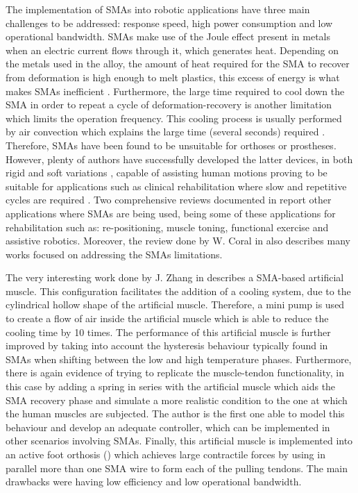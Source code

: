 The implementation of SMAs into robotic applications have three main challenges to be addressed: response speed, high power consumption and low operational bandwidth. SMAs make use of the Joule effect present in metals when an electric current flows through it, which generates heat. Depending on the metals used in the alloy, the amount of heat required for the SMA to recover from deformation is high enough to melt plastics, this excess of energy is what makes SMAs inefficient \cite{Bundhoo2009a}. Furthermore, the large time required to cool down the SMA in order to repeat a cycle of deformation-recovery is another limitation which limits the operation frequency. This cooling process is usually performed by air convection which explains the large time (several seconds) required \cite{Bundhoo2009}. Therefore, SMAs have been found to be unsuitable for orthoses or prostheses. However, plenty of authors have successfully developed the latter devices, in both rigid \cite{tarkesh2007} and soft variations \cite{Stirling2011}, capable of assisting human motions proving to be suitable for applications such as clinical rehabilitation where slow and repetitive cycles are required \cite{Pittaccio2009,Chenal2014}. Two comprehensive reviews documented in \cite{pittaccio2012shape,Coral2012} report other applications where SMAs are being used, being some of these applications for rehabilitation such as: re-positioning, muscle toning, functional exercise and assistive robotics. Moreover, the review done by W. Coral in \cite{Coral2012} also describes many works focused on addressing the SMAs limitations.

The very interesting work done by J. Zhang in \cite{Zhang2013a} describes a SMA-based artificial muscle. This configuration facilitates the addition of a cooling system, due to the cylindrical hollow shape of the artificial muscle. Therefore, a mini pump is used to create a flow of air inside the artificial muscle which is able to reduce the cooling time by 10 times. The performance of this artificial muscle is further improved by taking into account the hysteresis behaviour typically found in SMAs when shifting between the low and high temperature phases. Furthermore, there is again evidence of trying to replicate the muscle-tendon functionality, in this case by adding a spring in series with the artificial muscle which aids the SMA recovery phase and simulate a more realistic condition to the one at which the human muscles are subjected. The author is the first one able to model this behaviour and develop an adequate controller, which can be implemented in other scenarios involving SMAs. Finally, this artificial muscle is implemented into an active foot orthosis () which achieves large contractile forces by using in parallel more than one SMA wire to form each of the pulling tendons. The main drawbacks were having low efficiency and low operational bandwidth.

